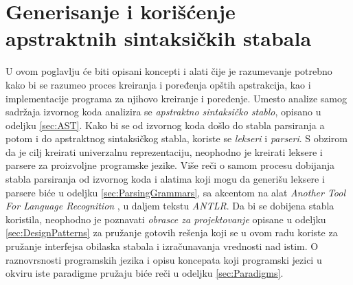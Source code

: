 \chapter[Apstraktna sintaksnička stabla]{Generisanje i korišćenje apstraktnih sintaksičkih stabala}
\label{chp:RelevantTerms}

U ovom poglavlju će biti opisani koncepti i alati čije je razumevanje potrebno kako bi se razumeo proces kreiranja i poređenja opštih apstrakcija, kao i implementacije programa za njihovo kreiranje i poređenje. Umesto analize samog sadržaja izvornog koda analizira se \emph{apstraktno sintaksičko stablo}, opisano u odeljku \ref{sec:AST}. Kako bi se od izvornog koda došlo do stabla parsiranja a potom i do apstraktnog sintaksičkog stabla, koriste se \emph{lekseri} i \emph{parseri}. S obzirom da je cilj kreirati univerzalnu reprezentaciju, neophodno je kreirati leksere i parsere za proizvoljne programske jezike. Više reči o samom procesu dobijanja stabla parsiranja od izvornog koda i alatima koji mogu da generišu leksere i parsere biće u odeljku \ref{sec:ParsingGrammars}, sa akcentom na alat \emph{Another Tool For Language Recognition} \cite{ANTLR}, u daljem tekstu \emph{ANTLR}. Da bi se dobijena stabla koristila, neophodno je poznavati \emph{obrasce za projektovanje} opisane u odeljku \ref{sec:DesignPatterns} za pružanje gotovih rešenja koji se u ovom radu koriste za pružanje interfejsa obilaska stabala i izračunavanja vrednosti nad istim. O raznovrsnosti programskih jezika i opisu koncepata koji programski jezici u okviru iste paradigme pružaju biće reči u odeljku \ref{sec:Paradigms}.





